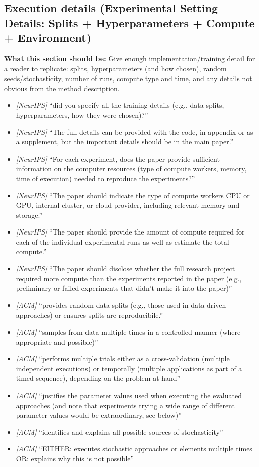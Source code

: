 \documentclass[11pt]{article}
\begin{document}
\subsection{Execution details (Experimental Setting Details: Splits + Hyperparameters + Compute + Environment)}
\noindent\textbf{What this section should be:}
Give enough implementation/training detail for a reader to replicate: splits, hyperparameters (and how chosen), random seeds/stochasticity, number of runs, compute type and time, and any details not obvious from the method description.
\begin{itemize}
  \item \textit{[NeurIPS]} ``did you specify all the training details (e.g., data splits, hyperparameters, how they were chosen)?''
  \item \textit{[NeurIPS]} ``The full details can be provided with the code, in appendix or as a supplement, but the important details should be in the main paper.''
  \item \textit{[NeurIPS]} ``For each experiment, does the paper provide sufficient information on the computer resources (type of compute workers, memory, time of execution) needed to reproduce the experiments?''
  \item \textit{[NeurIPS]} ``The paper should indicate the type of compute workers CPU or GPU, internal cluster, or cloud provider, including relevant memory and storage.''
  \item \textit{[NeurIPS]} ``The paper should provide the amount of compute required for each of the individual experimental runs as well as estimate the total compute.''
  \item \textit{[NeurIPS]} ``The paper should disclose whether the full research project required more compute than the experiments reported in the paper (e.g., preliminary or failed experiments that didn’t make it into the paper)''
  \item \textit{[ACM]} ``provides random data splits (e.g., those used in data-driven approaches) or ensures splits are reproducibile.''
  \item \textit{[ACM]} ``samples from data multiple times in a controlled manner (where appropriate and possible)''
  \item \textit{[ACM]} ``performs multiple trials either as a cross-validation (multiple independent executions) or temporally (multiple applications as part of a timed sequence), depending on the problem at hand''
  \item \textit{[ACM]} ``justifies the parameter values used when executing the evaluated approaches (and note that experiments trying a wide range of different parameter values would be extraordinary, see below)''
  \item \textit{[ACM]} ``identifies and explains all possible sources of stochasticity''
  \item \textit{[ACM]} ``EITHER: executes stochastic approaches or elements multiple times OR: explains why this is not possible''
\end{itemize}
\end{document}
